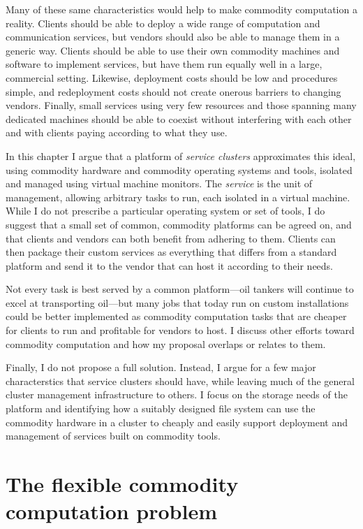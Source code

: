 Many of these same characteristics would help to make commodity computation a reality. Clients should be able to deploy a wide range of computation and communication services, but vendors should also be able to manage them in a generic way. Clients should be able to use their own commodity machines and software to implement services, but have them run equally well in a large, commercial setting. Likewise, deployment costs should be low and procedures simple, and redeployment costs should not create onerous barriers to changing vendors. Finally, small services using very few resources and those spanning many dedicated machines should be able to coexist without interfering with each other and with clients paying according to what they use.

In this chapter I argue that a platform of \emph{service clusters} approximates this ideal, using commodity hardware and commodity operating systems and tools, isolated and managed using virtual machine monitors. The \emph{service} is the unit of management, allowing arbitrary tasks to run, each isolated in a virtual machine. While I do not prescribe a particular operating system or set of tools, I do suggest that a small set of common, commodity platforms can be agreed on, and that clients and vendors can both benefit from adhering to them. Clients can then package their custom services as everything that differs from a standard platform and send it to the vendor that can host it according to their needs.

Not every task is best served by a common platform---oil tankers will continue to excel at transporting oil---but many jobs that today run on custom installations could be better implemented as commodity computation tasks that are cheaper for clients to run and profitable for vendors to host. I discuss other efforts toward commodity computation and how my proposal overlaps or relates to them.

Finally, I do not propose a full solution. Instead, I argue for a few major characterstics that service clusters should have, while leaving much of the general cluster management infrastructure to others. I focus on the storage needs of the platform and identifying how a suitably designed file system can use the commodity hardware in a cluster to cheaply and easily support deployment and management of services built on commodity tools.

\section{The flexible commodity computation problem}

